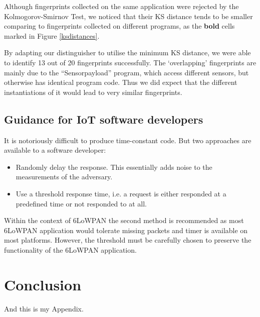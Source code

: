 \documentclass{article}
\begin{document}
Although fingerprints collected on the same application were rejected by the Kolmogorov-Smirnov Test, we noticed that their KS distance tends to be smaller comparing to fingerprints collected on different programs, as the \textbf{bold} cells marked in Figure \ref{ksdistances}. 

By adapting our distinguisher to utilise the minimum KS distance, we were able to identify 13 out of 20 fingerprints successfully. The `overlapping' fingerprints are mainly due to the ``Sensorpayload'' program, which access different sensors, but otherwise has identical program code. Thus we did expect that the different instantiations of it would lead to very similar fingerprints. 

\subsection{Guidance for IoT software developers}
It is notoriously difficult to produce time-constant code. But two approaches are available to a software developer:
\begin{itemize}
	\item Randomly delay the response. This essentially adds noise to the measurements of the adversary.
	 
	\item Use a threshold response time, i.e. a request is either responded at a predefined time or not responded to at all. 
\end{itemize}
Within the context of 6LoWPAN the second method is recommended as most 6LoWPAN application would tolerate missing packets and timer is available on most platforms. However, the threshold must be carefully chosen to preserve the functionality of the 6LoWPAN application.


\section{Conclusion}

\appendix

And this is my Appendix.
\end{document}
